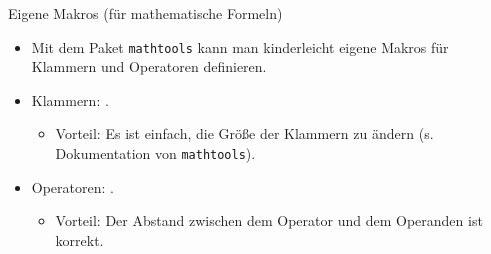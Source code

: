 \begin{frame}[fragile]{Eigene Makros (für mathematische Formeln)}
    \begin{itemize}
        \item Mit dem Paket \texttt{mathtools} kann man kinderleicht eigene Makros für Klammern und
            Operatoren definieren.
        \item Klammern: .
            \begin{itemize}
                \item Vorteil: Es ist einfach, die Größe der Klammern zu ändern (s. Dokumentation
                    von \texttt{mathtools}).
            \end{itemize}
        \item Operatoren: \code{\DeclareMathOperator{\macro}{<name>}}.
            \begin{itemize}
                \item Vorteil: Der Abstand zwischen dem Operator und dem Operanden ist korrekt.
            \end{itemize}
    \end{itemize}
\end{frame}
